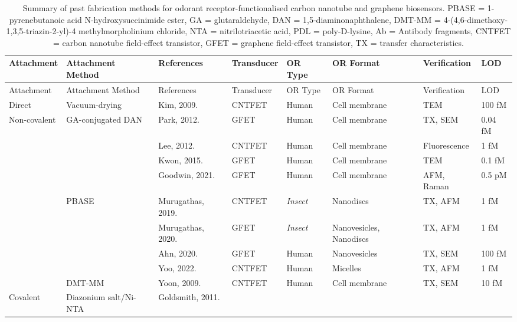 \documentclass[
  a4paper,
]{scrbook}
\begin{document}
\newpage
{}

\hypertarget{tbl-or-biosensors}{}
\begin{longtable}[]{@{}llllllll@{}}
\caption{\label{tbl-or-biosensors}Summary of past fabrication methods
for odorant receptor-functionalised carbon nanotube and graphene
biosensors. PBASE = 1-pyrenebutanoic acid N-hydroxysuccinimide ester, GA
= glutaraldehyde, DAN = 1,5-diaminonaphthalene, DMT-MM =
4-(4,6-dimethoxy-1,3,5-triazin-2-yl)-4 methylmorpholinium chloride, NTA
= nitrilotriacetic acid, PDL = poly-D-lysine, Ab = Antibody fragments,
CNTFET = carbon nanotube field-effect transistor, GFET = graphene
field-effect transistor, TX = transfer characteristics.}\tabularnewline
\toprule\noalign{}
Attachment & Attachment Method & References & Transducer & OR Type & OR
Format & Verification & LOD \\
\midrule\noalign{}
\endfirsthead
\toprule\noalign{}
Attachment & Attachment Method & References & Transducer & OR Type & OR
Format & Verification & LOD \\
\midrule\noalign{}
\endhead
\bottomrule\noalign{}
\endlastfoot
Direct & Vacuum-drying & Kim, 2009. \cite{Kim2009a} & CNTFET & Human &
Cell membrane & TEM & 100 fM \\
Non-covalent & GA-conjugated DAN & Park, 2012. \cite{Park2012} & GFET &
Human & Cell membrane & TX, SEM & 0.04 fM \\
& & Lee, 2012. \cite{Lee2012b} & CNTFET & Human & Cell membrane &
Fluorescence & 1 fM \\
& & Kwon, 2015. \cite{Kwon2015} & GFET & Human & Cell membrane & TEM &
0.1 fM \\
& & Goodwin, 2021. \cite{Goodwin2021} & GFET & Human & Cell membrane &
AFM, Raman & 0.5 pM \\
& PBASE & Murugathas, 2019. \cite{Murugathas2019a} & CNTFET &
\textit{Insect} & Nanodiscs & TX, AFM & 1 fM \\
& & Murugathas, 2020. \cite{Murugathas2020} & GFET & \textit{Insect} &
Nanovesicles, Nanodiscs & TX, AFM & 1 fM \\
& & Ahn, 2020. \cite{Ahn2020} & GFET & Human & Nanovesicles & TX, SEM &
100 fM \\
& & Yoo, 2022. \cite{Yoo2022} & CNTFET & Human & Micelles & TX, AFM & 1
fM \\
& DMT-MM & Yoon, 2009. \cite{Yoon2009} & CNTFET & Human & Cell membrane
& TX, SEM & 10 fM \\
Covalent & Diazonium salt/Ni-NTA & Goldsmith, 2011. \cite{Goldsmith2011}

\end{longtable}
\end{document}
